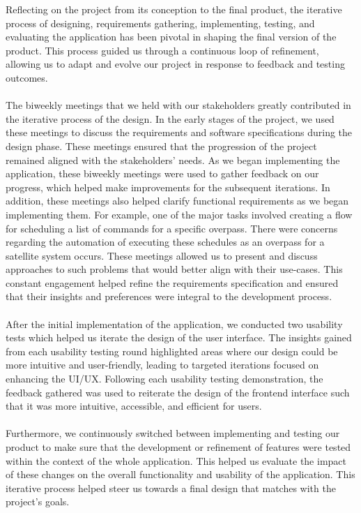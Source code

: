 \documentclass{article}
\begin{document}
Reflecting on the project from its conception to the final product, the iterative process of designing, requirements gathering, implementing, testing, and evaluating the application has been pivotal in shaping the final version of the product. This process guided us through a continuous loop of refinement, allowing us to adapt and evolve our project in response to feedback and testing outcomes.
\\ \\ 
The biweekly meetings that we held with our stakeholders greatly contributed in the iterative process of the design. In the early stages of the project, we used these meetings to discuss the requirements and software specifications during the design phase. These meetings ensured that the progression of the project remained aligned with the stakeholders' needs. As we began implementing the application, these biweekly meetings were used to gather feedback on our progress, which helped make improvements for the subsequent iterations. In addition, these meetings also helped clarify functional requirements as we began implementing them. For example, one of the major tasks involved creating a flow for scheduling a list of commands for a specific overpass. There were concerns regarding the automation of executing these schedules as an overpass for a satellite system occurs. These meetings allowed us to present and discuss approaches to such problems that would better align with their use-cases. This constant engagement helped refine the requirements specification and ensured that their insights and preferences were integral to the development process.
\\ \\
After the initial implementation of the application, we conducted two usability tests which helped us iterate the design of the user interface. The insights gained from each usability testing round highlighted areas where our design could be more intuitive and user-friendly, leading to targeted iterations focused on enhancing the UI/UX. Following each usability testing demonstration, the feedback gathered was used to reiterate the design of the frontend interface such that it was more intuitive, accessible, and efficient for users.
\\ \\
Furthermore, we continuously switched between implementing and testing our product to make sure that the development or refinement of features were tested within the context of the whole application. This helped us evaluate the impact of these changes on the overall functionality and usability of the application. This iterative process helped steer us towards a final design that matches with the project's goals.
\end{document}
